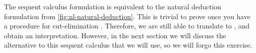 The sequent calculus formulation is equivalent to the natural
deduction formulation from \autoref{fig:nl-natural-deduction}.
This is trivial to prove once you have a procedure for cut-elimination
\citep[see][p.\ 107]{moot2012}. Therefore, we are still able to
translate to \lamET, and obtain an interpretation. However, in the
next section we will discuss the alternative to this sequent calculus
that we will use, so we will forgo this exercise.
